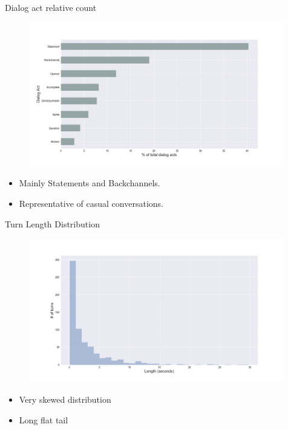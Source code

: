 \begin{frame}{Dialog act relative count}
\begin{minipage}{0.8\textwidth}
\begin{figure}[H]
\centering
\includegraphics[width=30em]{../scikitlearn/figures/f1.png}
\end{figure}
\end{minipage}
\begin{minipage}{0.8\textwidth}
\begin{itemize}
\item Mainly Statements and Backchannels.
\item Representative of casual conversations.
\end{itemize}
\end{minipage}
\end{frame}

\begin{frame}{Turn Length Distribution}
\begin{minipage}{0.8\textwidth}
\begin{figure}[H]
\centering
\includegraphics[width=30em]{../scikitlearn/figures/f10.png}\vspace{-1em}
\end{figure}
\end{minipage}
\begin{minipage}{0.8\textwidth}
\begin{itemize}
\item \small{Very skewed distribution}
\item \small{Long flat tail}
\end{itemize}
\end{minipage}
\end{frame}



